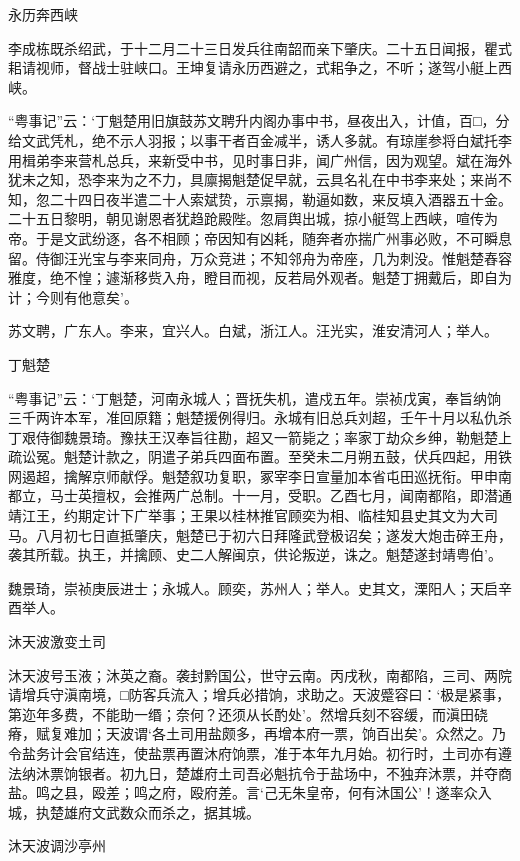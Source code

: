 \documentclass[]{article}
\begin{document}
永历奔西峡

李成栋既杀绍武，于十二月二十三日发兵往南韶而亲下肇庆。二十五日闻报，瞿式耜请视师，督战士驻峡口。王坤复请永历西避之，式耜争之，不听；遂驾小艇上西峡。

``粤事记''云：`丁魁楚用旧旗鼓苏文聘升内阁办事中书，昼夜出入，计值，百□，分给文武凭札，绝不示人羽报；以事干者百金减半，诱人多就。有琼崖参将白斌托李用楫弟李来营札总兵，来新受中书，见时事日非，闻广州信，因为观望。斌在海外犹未之知，恐李来为之不力，具廪揭魁楚促早就，云具名礼在中书李来处；来尚不知，忽二十四日夜半遣二十人索斌贽，示禀揭，勒逼如数，来反填入酒器五十金。二十五日黎明，朝见谢恩者犹趋跄殿陛。忽肩舆出城，掠小艇驾上西峡，喧传为帝。于是文武纷逐，各不相顾；帝因知有凶耗，随奔者亦揣广州事必败，不可瞬息留。侍御汪光宝与李来同舟，万众竞进；不知邻舟为帝座，几为刺没。惟魁楚舂容雅度，绝不惶；遽渐移赀入舟，瞪目而视，反若局外观者。魁楚丁拥戴后，即自为计；今则有他意矣'。

苏文聘，广东人。李来，宜兴人。白斌，浙江人。汪光实，淮安清河人；举人。

丁魁楚

``粤事记''云：`丁魁楚，河南永城人；晋抚失机，遣戍五年。崇祯戊寅，奉旨纳饷三千两许本军，准回原籍；魁楚援例得归。永城有旧总兵刘超，壬午十月以私仇杀丁艰侍御魏景琦。豫扶王汉奉旨往勘，超又一箭毙之；率家丁劫众乡绅，勒魁楚上疏讼冤。魁楚计款之，阴遣子弟兵四面布置。至癸未二月朔五鼓，伏兵四起，用铁网遏超，擒解京师献俘。魁楚叙功复职，冢宰李日宣量加本省屯田巡抚衔。甲申南都立，马士英擅权，会推两广总制。十一月，受职。乙酉七月，闻南都陷，即潜通靖江王，约期定计下广举事；王果以桂林推官顾奕为相、临桂知县史其文为大司马。八月初七日直抵肇庆，魁楚已于初六日拜隆武登极诏矣；遂发大炮击碎王舟，袭其所载。执王，并擒顾、史二人解闽京，供论叛逆，诛之。魁楚遂封靖粤伯'。

魏景琦，崇祯庚辰进士；永城人。顾奕，苏州人；举人。史其文，溧阳人；天启辛酉举人。

沐天波激变土司

沐天波号玉液；沐英之裔。袭封黔国公，世守云南。丙戌秋，南都陷，三司、两院请增兵守滇南境，□防客兵流入；增兵必措饷，求助之。天波蹙容曰：`极是紧事，第迩年多费，不能助一缗；奈何？还须从长酌处'。然增兵刻不容缓，而滇田硗瘠，赋复难加；天波谓`各土司用盐颇多，再增本府一票，饷百出矣'。众然之。乃令盐务计会官结连，使盐票再置沐府饷票，准于本年九月始。初行时，土司亦有遵法纳沐票饷银者。初九日，楚雄府土司吾必魁抗令于盐场中，不独弃沐票，并夺商盐。鸣之县，殴差；鸣之府，殴府差。言`己无朱皇帝，何有沐国公'！遂率众入城，执楚雄府文武数众而杀之，据其城。

沐天波调沙亭州
\end{document}
